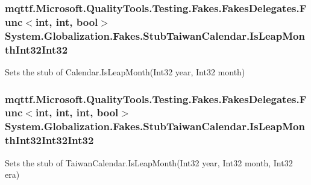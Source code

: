 \hypertarget{class_system_1_1_globalization_1_1_fakes_1_1_stub_taiwan_calendar_a262e84b0323c579b62ff7e49742e1783}{
\subsubsection[{Is\-Leap\-Month\-Int32\-Int32}]{\setlength{\rightskip}{0pt plus 5cm}mqttf.\-Microsoft.\-Quality\-Tools.\-Testing.\-Fakes.\-Fakes\-Delegates.\-Func$<$int, int, bool$>$ System.\-Globalization.\-Fakes.\-Stub\-Taiwan\-Calendar.\-Is\-Leap\-Month\-Int32\-Int32}}\label{class_system_1_1_globalization_1_1_fakes_1_1_stub_taiwan_calendar_a262e84b0323c579b62ff7e49742e1783}


Sets the stub of Calendar.\-Is\-Leap\-Month(\-Int32 year, Int32 month)

\hypertarget{class_system_1_1_globalization_1_1_fakes_1_1_stub_taiwan_calendar_a511cf1a1b0505b5d66fef464aadb6fc3}{
\subsubsection[{Is\-Leap\-Month\-Int32\-Int32\-Int32}]{\setlength{\rightskip}{0pt plus 5cm}mqttf.\-Microsoft.\-Quality\-Tools.\-Testing.\-Fakes.\-Fakes\-Delegates.\-Func$<$int, int, int, bool$>$ System.\-Globalization.\-Fakes.\-Stub\-Taiwan\-Calendar.\-Is\-Leap\-Month\-Int32\-Int32\-Int32}}\label{class_system_1_1_globalization_1_1_fakes_1_1_stub_taiwan_calendar_a511cf1a1b0505b5d66fef464aadb6fc3}


Sets the stub of Taiwan\-Calendar.\-Is\-Leap\-Month(\-Int32 year, Int32 month, Int32 era)

